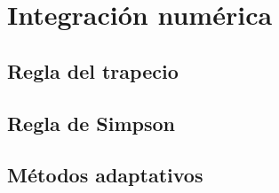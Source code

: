 
\section{Integración numérica}
\subsection{Regla del trapecio}
\subsection{Regla de Simpson}
\subsection{Métodos adaptativos}
